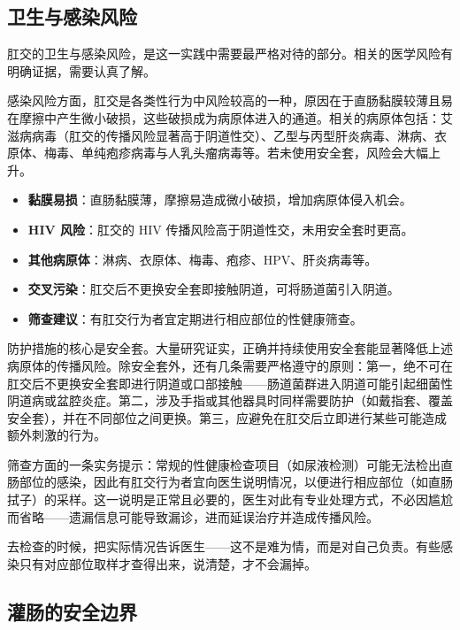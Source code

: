 \documentclass[12pt,UTF8]{ctexbook}
\newcommand{\keyword}[1]{\textbf{#1}}
\begin{document}
\subsection{卫生与感染风险}

肛交的卫生与感染风险，是这一实践中需要最严格对待的部分。相关的医学风险有明确证据，需要认真了解。

感染风险方面，肛交是各类性行为中风险较高的一种，原因在于直肠黏膜较薄且易在摩擦中产生微小破损，这些破损成为病原体进入的通道。相关的病原体包括：艾滋病病毒（肛交的传播风险显著高于阴道性交）、乙型与丙型肝炎病毒、淋病、衣原体、梅毒、单纯疱疹病毒与人乳头瘤病毒等。若未使用安全套，风险会大幅上升。

\begin{itemize}
	\item \keyword{黏膜易损}：直肠黏膜薄，摩擦易造成微小破损，增加病原体侵入机会。
	\item \keyword{HIV 风险}：肛交的 HIV 传播风险高于阴道性交，未用安全套时更高。
	\item \keyword{其他病原体}：淋病、衣原体、梅毒、疱疹、HPV、肝炎病毒等。
	\item \keyword{交叉污染}：肛交后不更换安全套即接触阴道，可将肠道菌引入阴道。
	\item \keyword{筛查建议}：有肛交行为者宜定期进行相应部位的性健康筛查。
\end{itemize}

防护措施的核心是安全套。大量研究证实，正确并持续使用安全套能显著降低上述病原体的传播风险。除安全套外，还有几条需要严格遵守的原则：第一，绝不可在肛交后不更换安全套即进行阴道或口部接触——肠道菌群进入阴道可能引起细菌性阴道病或盆腔炎症。第二，涉及手指或其他器具时同样需要防护（如戴指套、覆盖安全套），并在不同部位之间更换。第三，应避免在肛交后立即进行某些可能造成额外刺激的行为。

筛查方面的一条实务提示：常规的性健康检查项目（如尿液检测）可能无法检出直肠部位的感染，因此有肛交行为者宜向医生说明情况，以便进行相应部位（如直肠拭子）的采样。这一说明是正常且必要的，医生对此有专业处理方式，不必因尴尬而省略——遗漏信息可能导致漏诊，进而延误治疗并造成传播风险。

\begin{tcolorbox}[colback=pink!5!white,colframe=red!50!black,title=贴心小叮咛]
	去检查的时候，把实际情况告诉医生——这不是难为情，而是对自己负责。有些感染只有对应部位取样才查得出来，说清楚，才不会漏掉。
\end{tcolorbox}
\subsection{灌肠的安全边界}
\end{document}
